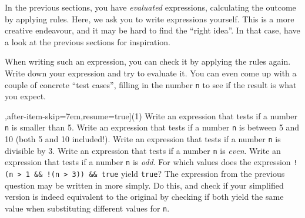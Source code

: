 In the previous sections, you have \emph{evaluated} expressions, calculating the outcome by applying rules. Here, we ask you to write expressions yourself. This is a more creative endeavour, and it may be hard to find the ``right idea''. In that case, have a look at the previous sections for inspiration.

When writing such an expression, you can check it by applying the rules again. Write down your expression and try to evaluate it. You can even come up with a couple of concrete ``test cases'', filling in the number \texttt{n} to see if the result is what you expect.

\begin{exercise}
    \begin{longtasks}[counter-format=2.tsk[1],after-item-skip=7em,resume=true](1)
        \task
        Write an expression that tests if a number \texttt{n} is smaller than 5.
        \task
        Write an expression that tests if a number \texttt{n} is between 5 and 10 (both 5 and 10 included!).
        \task
        Write an expression that tests if a number \texttt{n} is divisible by 3.
        \task
        Write an expression that tests if a number \texttt{n} is \emph{even}.
        \task
        Write an expression that tests if a number \texttt{n} is \emph{odd}.
        \task
        For which values does the expression \texttt{!(n > 1 \&\& !(n > 3)) \&\& true} yield \texttt{true}?
        \task
        The expression from the previous question may be written in more simply. Do this, and check if your simplified version is indeed equivalent to the original by checking if both yield the same value when substituting different values for \texttt{n}.
    \end{longtasks}
\end{exercise}




